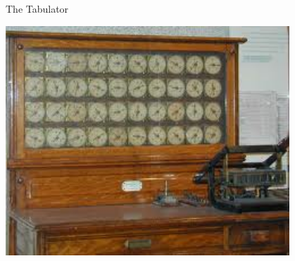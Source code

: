 \documentclass[xcolor={dvipsnames}]{beamer}
\begin{document}
\begin{frame}{The Tabulator}
	\begin{center}
	\href{http://channel.nationalgeographic.com/channel/the-link/videos/the-tabulator/}{\includegraphics[width=0.8\textwidth] {tabulator}}
	\end{center}
\end{frame}
\end{document}
